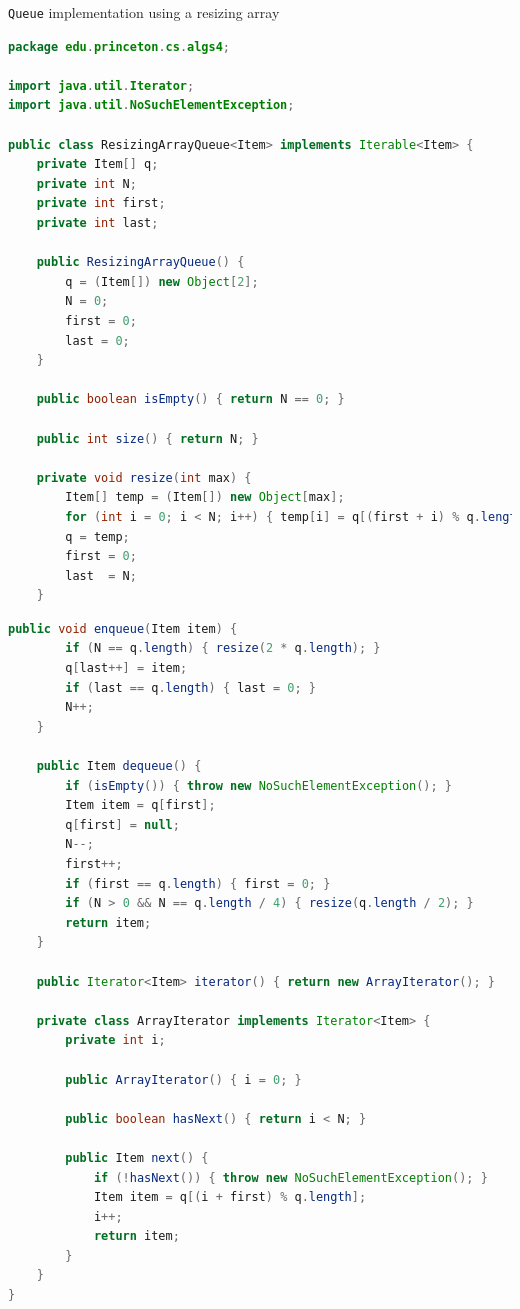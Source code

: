 \documentclass[8pt,a4paper,compress]{beamer}
\begin{document}
\begin{frame}[fragile]
\pause

\lstinline{Queue} implementation using a resizing array
\begin{lstlisting}[language=Java]
package edu.princeton.cs.algs4;

import java.util.Iterator;
import java.util.NoSuchElementException;

public class ResizingArrayQueue<Item> implements Iterable<Item> {
    private Item[] q; 
    private int N; 
    private int first; 
    private int last;

    public ResizingArrayQueue() {
        q = (Item[]) new Object[2];
        N = 0;
        first = 0;
        last = 0;
    }

    public boolean isEmpty() { return N == 0; }

    public int size() { return N; }

    private void resize(int max) {
        Item[] temp = (Item[]) new Object[max];
        for (int i = 0; i < N; i++) { temp[i] = q[(first + i) % q.length]; }
        q = temp;
        first = 0;
        last  = N;
    }
\end{lstlisting}
\end{frame}

\begin{frame}[fragile]
\pause

\begin{lstlisting}[language=Java]
    public void enqueue(Item item) {
        if (N == q.length) { resize(2 * q.length); }
        q[last++] = item; 
        if (last == q.length) { last = 0; }
        N++;
    }

    public Item dequeue() {
        if (isEmpty()) { throw new NoSuchElementException(); }
        Item item = q[first];
        q[first] = null; 
        N--;
        first++;
        if (first == q.length) { first = 0; }
        if (N > 0 && N == q.length / 4) { resize(q.length / 2); } 
        return item;
    }

    public Iterator<Item> iterator() { return new ArrayIterator(); }

    private class ArrayIterator implements Iterator<Item> {
        private int i;

        public ArrayIterator() { i = 0; } 
        
        public boolean hasNext() { return i < N; }

        public Item next() {
            if (!hasNext()) { throw new NoSuchElementException(); }
            Item item = q[(i + first) % q.length];
            i++;
            return item;
        }
    }
}
\end{lstlisting}
\end{frame}
\end{document}
